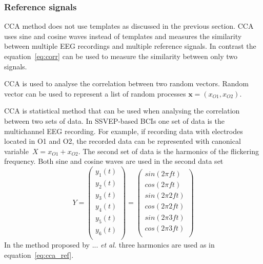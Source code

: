 \subsubsection{Reference signals}

\gls{CCA} method does not use templates as discussed in the previous section. \gls{CCA} uses sine and cosine waves instead of templates and measures the similarity between multiple \gls{EEG} recordings and multiple reference signals. In contrast the equation~\ref{eq:corr} can be used to measure the similarity between only two signals.

\gls{CCA} is used to analyse the correlation between two random vectors. Random vector can be used to represent a list of random processes $\mathbf{x}=(x_{O1}, x_{O2})$.

\Gls{CCA} is statistical method that can be used when analysing the correlation between two sets of data. In \gls{SSVEP}-based \glspl{BCI} one set of data is the multichannel \gls{EEG} recording. For example, if recording data with electrodes located in O1 and O2, the recorded data can be represented with canonical variable~$X=x_{O1}+x_{O2}$. The second set of data is the \glspl{harmonic} of the \gls{flickering} frequency. Both sine and cosine waves are used in the second data set %
\begin{equation}
	\label{eq:cca_ref}
	Y=\begin{pmatrix}
		y_1(t)\\
		y_2(t)\\
		y_3(t)\\
		y_4(t)\\
		y_5(t)\\
		y_6(t)\\
	\end{pmatrix}=\begin{pmatrix}
		sin(2\pi ft)\\
		cos(2\pi ft)\\
		sin(2\pi 2ft)\\
		cos(2\pi 2ft)\\
		sin(2\pi 3ft)\\
		cos(2\pi 3ft)\\
	\end{pmatrix}
\end{equation}
In the method proposed by ... \textit{et al.} three harmonics are used as in equation~\ref{eq:cca_ref}.
